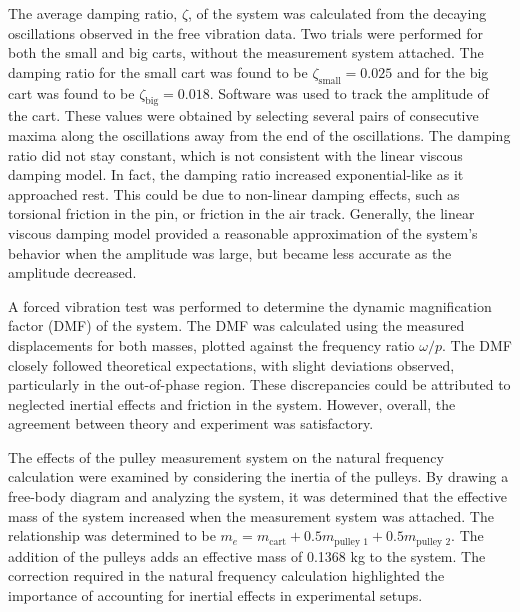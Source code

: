 The average damping ratio, $\zeta$, of the system was calculated from the decaying oscillations observed in the free vibration data. Two trials were performed for both the small and big carts, without the measurement system attached. The damping ratio for the small cart was found to be $\zeta_{\text{small}} = 0.025$ and for the big cart was found to be $\zeta_{\text{big}} = 0.018$. Software was used to track the amplitude of the cart. These values were obtained by selecting several pairs of consecutive maxima along the oscillations away from the end of the oscillations. The damping ratio did not stay constant, which is not consistent with the linear viscous damping model. In fact, the damping ratio increased exponential-like as it approached rest.  This could be due to non-linear damping effects, such as torsional friction in the pin, or friction in the air track. Generally, the linear viscous damping model provided a reasonable approximation of the system's behavior when the amplitude was large, but became less accurate as the amplitude decreased.

A forced vibration test was performed to determine the dynamic magnification factor (DMF) of the system. The DMF was calculated using the measured displacements for both masses, plotted against the frequency ratio $\omega/p$. The DMF closely followed theoretical expectations, with slight deviations observed, particularly in the out-of-phase region. These discrepancies could be attributed to neglected inertial effects and friction in the system. However, overall, the agreement between theory and experiment was satisfactory.

The effects of the pulley measurement system on the natural frequency calculation were examined by considering the inertia of the pulleys. By drawing a free-body diagram and analyzing the system, it was determined that the effective mass of the system increased when the measurement system was attached. The relationship was determined to be $m_e = m_{\text{cart}} + 0.5 m_{\text{pulley 1}} + 0.5 m_{\text{pulley 2}}$. The addition of the pulleys adds an effective mass of 0.1368 kg to the system. The correction required in the natural frequency calculation highlighted the importance of accounting for inertial effects in experimental setups.

